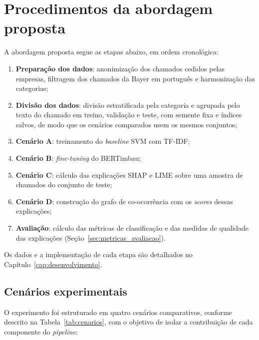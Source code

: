 \documentclass[
    12pt,                %
    openright,           %
    oneside,             %
    a4paper,             %
    english,             %
    brazil               %
]{abntex2}
\begin{document}
\section{Procedimentos da abordagem proposta}
\label{sec:procedimentos}

A abordagem proposta segue as etapas abaixo, em ordem cronológica:

\begin{enumerate}
    \item \textbf{Preparação dos dados}: anonimização dos chamados cedidos pelas empresas, filtragem dos chamados da Bayer em português e harmonização das categorias;

    \item \textbf{Divisão dos dados}: divisão estratificada pela categoria e agrupada pelo texto do chamado em treino, validação e teste, com semente fixa e índices salvos, 
    de modo que os cenários comparados usem os mesmos conjuntos;

    \item \textbf{Cenário A}: treinamento do \textit{baseline} SVM com TF-IDF;

    \item \textbf{Cenário B}: \textit{fine-tuning} do BERTimbau;

    \item \textbf{Cenário C}: cálculo das explicações SHAP e LIME sobre uma amostra de chamados do conjunto de teste;

    \item \textbf{Cenário D}: construção do grafo de co-ocorrência com os \textit{scores} dessas explicações;

    \item \textbf{Avaliação}: cálculo das métricas de classificação e das medidas de 
    qualidade das explicações (Seção~\ref{sec:metricas_avaliacao}).
\end{enumerate}

Os dados e a implementação de cada etapa são detalhados no Capítulo~\ref{cap:desenvolvimento}.

\subsection{Cenários experimentais}
\label{subsec:experimentos}

O experimento foi estruturado em quatro cenários comparativos, conforme descrito na Tabela~\ref{tab:cenarios}, com o objetivo de isolar a contribuição de cada componente do \textit{pipeline}:
\end{document}
